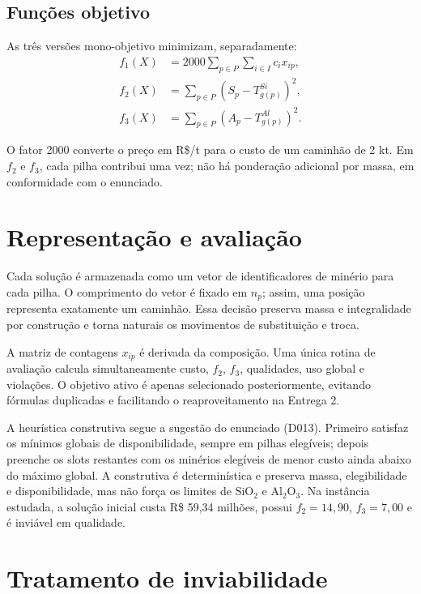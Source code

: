 \documentclass[10pt,twocolumn,a4paper]{article}
\begin{document}
\subsection{Funções objetivo}

As três versões mono-objetivo minimizam, separadamente:
\begin{align}
f_1(X) &= 2000 \sum_{p \in P} \sum_{i \in I} c_i x_{ip}, \\
f_2(X) &= \sum_{p \in P} \left( S_p - T_{g(p)}^{Si} \right)^2, \\
f_3(X) &= \sum_{p \in P} \left( A_p - T_{g(p)}^{Al} \right)^2.
\end{align}

O fator 2000 converte o preço em R\$/t para o custo de um caminhão de 2 kt. Em $f_2$ e $f_3$, cada pilha contribui uma vez; não há ponderação adicional por massa, em conformidade com o enunciado.

\section{Representação e avaliação}

Cada solução é armazenada como um vetor de identificadores de minério para cada pilha. O comprimento do vetor é fixado em $n_p$; assim, uma posição representa exatamente um caminhão. Essa decisão preserva massa e integralidade por construção e torna naturais os movimentos de substituição e troca.

A matriz de contagens $x_{ip}$ é derivada da composição. Uma única rotina de avaliação calcula simultaneamente custo, $f_2$, $f_3$, qualidades, uso global e violações. O objetivo ativo é apenas selecionado posteriormente, evitando fórmulas duplicadas e facilitando o reaproveitamento na Entrega 2.

A heurística construtiva segue a sugestão do enunciado (D013). Primeiro satisfaz os mínimos globais de disponibilidade, sempre em pilhas elegíveis; depois preenche os slots restantes com os minérios elegíveis de menor custo ainda abaixo do máximo global. A construtiva é determinística e preserva massa, elegibilidade e disponibilidade, mas não força os limites de $\text{SiO}_2$ e $\text{Al}_2\text{O}_3$. Na instância estudada, a solução inicial custa R\$ 59,34 milhões, possui $f_2 = 14,90$, $f_3 = 7,00$ e é inviável em qualidade.

\section{Tratamento de inviabilidade}
\end{document}
